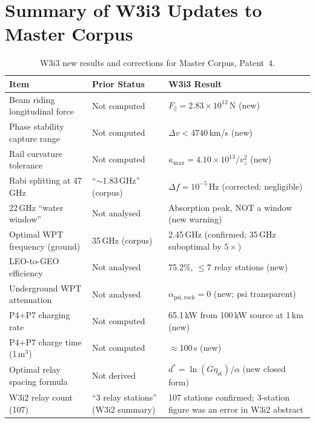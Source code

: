 \documentclass[aps,prd,twocolumn,superscriptaddress]{revtex4-2}
\begin{document}
\section*{Summary of W3i3 Updates to Master Corpus}
\label{sec:corrections}

\begin{table}[h]
\caption{W3i3 new results and corrections for Master Corpus, Patent~4.}
\label{tab:corrections}
\begin{ruledtabular}
\begin{tabular}{lll}
Item & Prior Status & W3i3 Result \\
\hline
Beam riding longitudinal force & Not computed &
  $F_\parallel = 2.83\times10^{13}$\,N (new) \\
Phase stability capture range & Not computed &
  $\Delta v < 4740$\,km/s (new) \\
Rail curvature tolerance & Not computed &
  $\kappa_\mathrm{max} = 4.10\times10^{13}/v_z^2$ (new) \\
Rabi splitting at 47\,GHz & ``$\sim$1.83\,GHz'' (corpus) &
  $\Delta f = 10^{-5}$\,Hz (corrected: negligible) \\
22\,GHz ``water window'' & Not analysed &
  Absorption peak, NOT a window (new warning) \\
Optimal WPT frequency (ground) & 35\,GHz (corpus) &
  2.45\,GHz (confirmed; 35\,GHz suboptimal by $5\times$) \\
LEO-to-GEO efficiency & Not analysed &
  75.2\%, $\leq$7 relay stations (new) \\
Underground WPT attenuation & Not analysed &
  $\alpha_\mathrm{psi,rock} = 0$ (new; psi transparent) \\
P4+P7 charging rate & Not computed &
  65.1\,kW from 100\,kW source at 1\,km (new) \\
P4+P7 charge time (1\,m$^3$) & Not computed &
  $\approx$100\,s (new) \\
Optimal relay spacing formula & Not derived &
  $d^* = \ln(G\eta_\mathrm{st})/\alpha$ (new closed form) \\
W3i2 relay count (107) & ``3 relay stations'' (W3i2 summary) &
  107 stations confirmed; 3-station figure was an error in W3i2 abstract \\
\end{tabular}
\end{ruledtabular}
\end{table}
\end{document}
